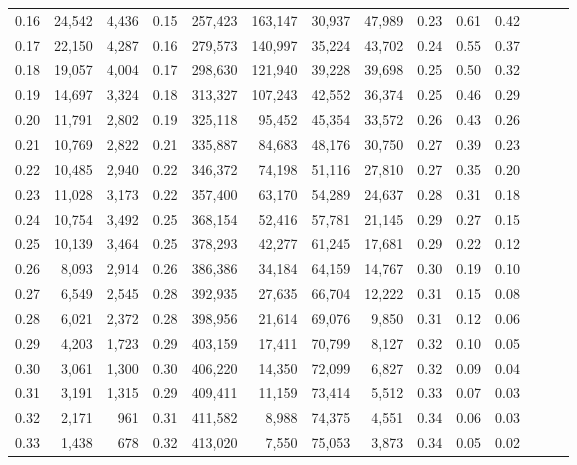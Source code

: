 \begin{tabular}{rrrrrrrrrrrrrr}
0.16 &  24,542 &  4,436 &  0.15 &  257,423 &  163,147 &  30,937 &  47,989 &  0.23 &  0.61 &      0.42 \\
0.17 &  22,150 &  4,287 &  0.16 &  279,573 &  140,997 &  35,224 &  43,702 &  0.24 &  0.55 &      0.37 \\
0.18 &  19,057 &  4,004 &  0.17 &  298,630 &  121,940 &  39,228 &  39,698 &  0.25 &  0.50 &      0.32 \\
0.19 &  14,697 &  3,324 &  0.18 &  313,327 &  107,243 &  42,552 &  36,374 &  0.25 &  0.46 &      0.29 \\
0.20 &  11,791 &  2,802 &  0.19 &  325,118 &   95,452 &  45,354 &  33,572 &  0.26 &  0.43 &      0.26 \\
0.21 &  10,769 &  2,822 &  0.21 &  335,887 &   84,683 &  48,176 &  30,750 &  0.27 &  0.39 &      0.23 \\
0.22 &  10,485 &  2,940 &  0.22 &  346,372 &   74,198 &  51,116 &  27,810 &  0.27 &  0.35 &      0.20 \\
0.23 &  11,028 &  3,173 &  0.22 &  357,400 &   63,170 &  54,289 &  24,637 &  0.28 &  0.31 &      0.18 \\
0.24 &  10,754 &  3,492 &  0.25 &  368,154 &   52,416 &  57,781 &  21,145 &  0.29 &  0.27 &      0.15 \\
0.25 &  10,139 &  3,464 &  0.25 &  378,293 &   42,277 &  61,245 &  17,681 &  0.29 &  0.22 &      0.12 \\
0.26 &   8,093 &  2,914 &  0.26 &  386,386 &   34,184 &  64,159 &  14,767 &  0.30 &  0.19 &      0.10 \\
0.27 &   6,549 &  2,545 &  0.28 &  392,935 &   27,635 &  66,704 &  12,222 &  0.31 &  0.15 &      0.08 \\
0.28 &   6,021 &  2,372 &  0.28 &  398,956 &   21,614 &  69,076 &   9,850 &  0.31 &  0.12 &      0.06 \\
0.29 &   4,203 &  1,723 &  0.29 &  403,159 &   17,411 &  70,799 &   8,127 &  0.32 &  0.10 &      0.05 \\
0.30 &   3,061 &  1,300 &  0.30 &  406,220 &   14,350 &  72,099 &   6,827 &  0.32 &  0.09 &      0.04 \\
0.31 &   3,191 &  1,315 &  0.29 &  409,411 &   11,159 &  73,414 &   5,512 &  0.33 &  0.07 &      0.03 \\
0.32 &   2,171 &    961 &  0.31 &  411,582 &    8,988 &  74,375 &   4,551 &  0.34 &  0.06 &      0.03 \\
0.33 &   1,438 &    678 &  0.32 &  413,020 &    7,550 &  75,053 &   3,873 &  0.34 &  0.05 &      0.02 \\

\end{tabular}
